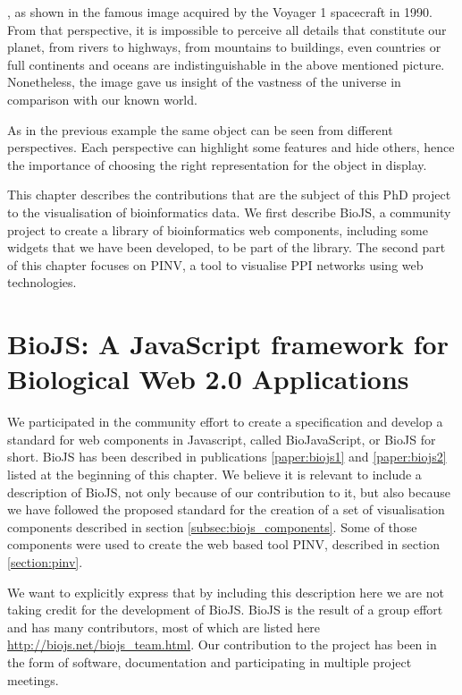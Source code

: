 \newpage
{}, as shown in the famous image acquired by the Voyager 1 spacecraft in 1990. From that perspective, it is impossible to perceive all details that constitute our planet, from rivers to highways, from mountains to buildings, even countries or full continents and oceans are indistinguishable in the above mentioned picture. Nonetheless, the image gave us insight of the vastness of the universe in comparison with our known world.

As in the previous example the same object can be seen from different perspectives. Each perspective can highlight some features and hide others, hence the importance of choosing the right representation for the object in display.

This chapter describes the contributions that are the subject of this PhD project to the visualisation of bioinformatics data. We first describe BioJS, a community project to create a library of bioinformatics web components, including some widgets that we have been developed, to be part of the library. The second part of this chapter focuses on PINV, a tool to visualise PPI networks using web technologies.


\section{BioJS: A JavaScript framework for Biological Web 2.0 Applications }
We participated in the community effort to create a specification and develop a standard for web components in Javascript, called BioJavaScript, or BioJS for short. BioJS has been described in publications \ref{paper:biojs1} and \ref{paper:biojs2} listed at the beginning of this chapter. We believe it is relevant to include a description of BioJS, not only because of our contribution to it, but also because we have followed the proposed standard for the creation of a set of visualisation components described in  section \ref{subsec:biojs_components}. Some of those components were used to create the web based tool PINV, described in section \ref{section:pinv}.

We want to explicitly express that by including this description here we are not taking credit for the development of BioJS. BioJS is the result of a group effort and has many contributors, most of which are listed here \url{http://biojs.net/biojs_team.html}. Our contribution to the project has been in the form of software, documentation and participating in multiple project meetings.

